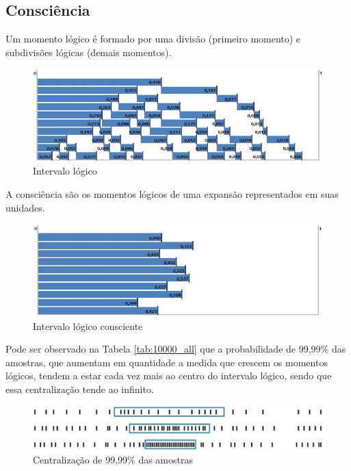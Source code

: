 \subsection{Consciência}
Um momento lógico é formado por uma divisão (primeiro momento) e subdivisões lógicas (demais momentos).
\begin{figure}[H]
\caption{Intervalo lógico}
\label{fig:consciousness_logical_moments}
\centering
\includegraphics[scale=.7]{sections/images/consciousness_logical_moments.jpg}
\end{figure}

A consciência são os momentos lógicos de uma expansão representados em suas unidades.
\begin{figure}[H]
\caption{Intervalo lógico consciente}
\label{fig:consciousness}
\centering
\includegraphics[scale=.7]{sections/images/consciousness.jpg}
\end{figure}

Pode ser observado na Tabela \ref{tab:10000_all} que a probabilidade de 99,99\% das amostras, que aumentam em quantidade a medida que crescem os momentos lógicos, tendem a estar cada vez mais ao centro do intervalo lógico, sendo que essa centralização tende ao infinito.
\begin{figure}[H]
\caption{Centralização de 99,99\% das amostras}
\label{fig:centering_of_99_range}
\centering
\includegraphics[scale=1]{sections/images/centering_of_99_range.jpg}
\end{figure}

